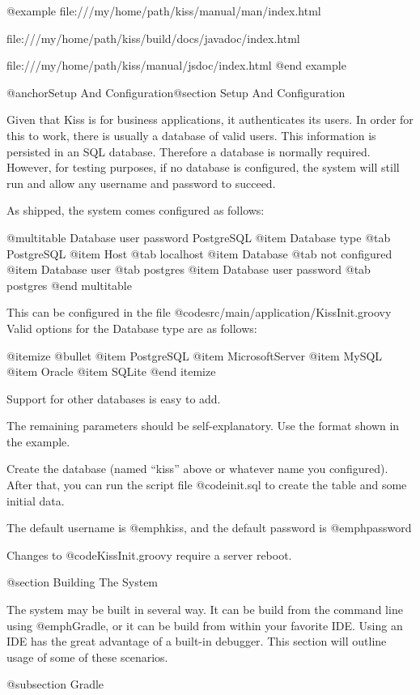 @example
file:///my/home/path/kiss/manual/man/index.html

file:///my/home/path/kiss/build/docs/javadoc/index.html

file:///my/home/path/kiss/manual/jsdoc/index.html
@end example

@anchor{Setup And Configuration}@section Setup And Configuration

Given that Kiss is for business applications, it authenticates its
users.  In order for this to work, there is usually a database of valid
users.  This information is persisted in an SQL database.  Therefore a
database is normally required.  However, for testing purposes, if no
database is configured, the system will still run and allow any
username and password to succeed.

As shipped, the system comes configured as follows:

@multitable {Database user password} {PostgreSQL} 
@item Database type
@tab PostgreSQL
@item Host
@tab localhost
@item Database
@tab not configured
@item Database user
@tab postgres
@item Database user password
@tab postgres
@end multitable

This can be configured in the file @code{src/main/application/KissInit.groovy}
Valid options for the Database type are as follows:

@itemize @bullet
@item
PostgreSQL
@item
MicrosoftServer
@item
MySQL
@item
Oracle
@item
SQLite
@end itemize

Support for other databases is easy to add.

The remaining parameters should be self-explanatory.  Use the format
shown in the example.

Create the database (named ``kiss'' above or whatever name you
configured).  After that, you can run the script file @code{init.sql}
to create the table and some initial data.

The default username is @emph{kiss}, and the default password is
@emph{password}

Changes to  @code{KissInit.groovy} require a server reboot.

@section Building The System

The system may be built in several way.  It can be build from the
command line using @emph{Gradle}, or it can be build from within your
favorite IDE.  Using an IDE has the great advantage of a built-in
debugger.  This section will outline usage of some of these scenarios.

@subsection Gradle 

